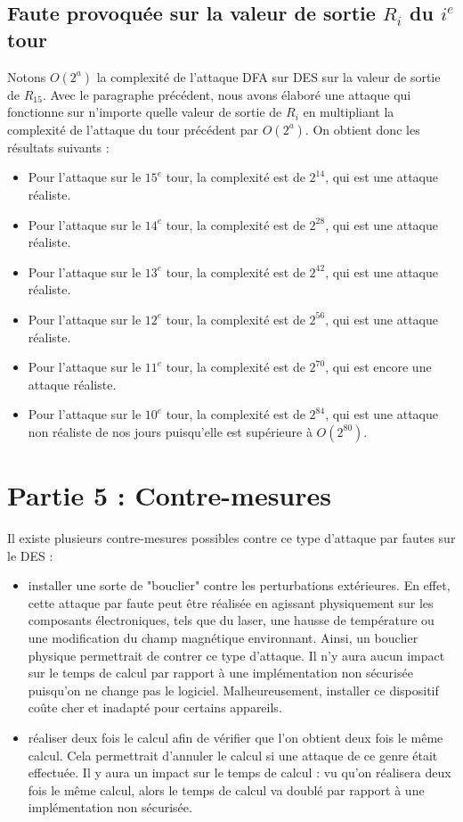 \documentclass[11pt]{article}
\begin{document}
\subsection{Faute provoquée sur la valeur de sortie $R_{i}$ du $i^{e}$ tour}

Notons $O(2^a)$ la complexité de l'attaque DFA sur DES sur la valeur de sortie de $R_{15}$. Avec le paragraphe précédent, nous avons élaboré une attaque qui fonctionne sur n'importe quelle valeur de sortie de $R_i$ en multipliant la complexité de l'attaque du tour précédent par $O(2^a)$. On obtient donc les résultats suivants : 

\begin{itemize}
	\item Pour l'attaque sur le $15^e$ tour, la complexité est de $2^{14}$, qui est une attaque réaliste. 
	\item Pour l'attaque sur le $14^e$ tour, la complexité est de $2^{28}$, qui est une attaque réaliste. 
	\item Pour l'attaque sur le $13^e$ tour, la complexité est de $2^{42}$, qui est une attaque réaliste. 
	\item Pour l'attaque sur le $12^e$ tour, la complexité est de $2^{56}$, qui est une attaque réaliste. 
	\item Pour l'attaque sur le $11^e$ tour, la complexité est de $2^{70}$, qui est encore une attaque réaliste. 
	\item Pour l'attaque sur le $10^e$ tour, la complexité est de $2^{84}$, qui est une attaque non réaliste de nos jours puisqu'elle est supérieure à $O(2^{80})$. 
	
\end{itemize}

\section{Partie 5 : Contre-mesures}

Il existe plusieurs contre-mesures possibles contre ce type d'attaque par fautes sur le DES : 
\begin{itemize}
	\item installer une sorte de "bouclier" contre les perturbations extérieures. En effet, cette attaque par faute peut être réalisée en agissant physiquement sur les composants électroniques, tels que du laser, une hausse de température ou une modification du champ magnétique environnant. Ainsi, un bouclier physique permettrait de contrer ce type d'attaque. Il n'y aura aucun impact sur le temps de calcul par rapport à une implémentation non sécurisée puisqu'on ne change pas le logiciel. Malheureusement, installer ce dispositif coûte cher et inadapté pour certains appareils. \newline
	
	\item réaliser deux fois le calcul afin de vérifier que l'on obtient deux fois le même calcul. Cela permettrait d'annuler le calcul si une attaque de ce genre était effectuée. Il y aura un impact sur le temps de calcul : vu qu'on réalisera deux fois le même calcul, alors le temps de calcul va doublé par rapport à une implémentation non sécurisée. 
\end{itemize}
\end{document}
